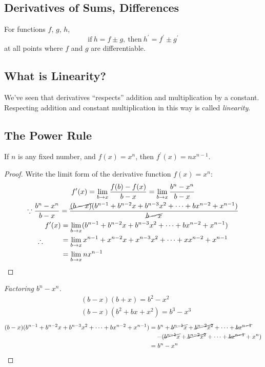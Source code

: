 \subsection{Derivatives of Sums, Differences}
For functions $f$, $g$, $h$,
\[\text{if}\ h=f\pm g,\ \text{then}\ h^\prime=f^\prime\pm g^\prime\]
at all points where $f$ and $g$ are differentiable.

\subsection{What is Linearity?}
We've seen that derivatives ``respects'' addition and multiplication by a constant. Respecting addition and constant multiplication in this way is called \textit{linearity}.

\subsection{The Power Rule}
If $n$ is any fixed number, and $f(x)=x^n$, then $f^\prime(x)=nx^{n-1}$.

\begin{proof}
  Write the limit form of the derivative function $f(x)=x^n$:
  \begin{gather*}
    f^\prime(x)=\lim_{b\to x}\frac{f(b)-f(x)}{b-x}=\lim_{b\to x}\frac{b^n-x^n}{b-x}\\
    \because\frac{b^n-x^n}{b-x}=\frac{\cancel{(b-x)}(b^{n-1}+b^{n-2}x+b^{n-3}x^2+\cdots+bx^{n-2}+x^{n-1})}{\cancel{b-x}}\\
    \therefore\begin{align*}
      f^\prime(x) & =\lim_{b\to x}(b^{n-1}+b^{n-2}x+b^{n-3}x^2+\cdots+bx^{n-2}+x^{n-1})\\
      & =\lim_{b\to x}x^{n-1}+x^{n-2}x+x^{n-3}x^2+\cdots+xx^{n-2}+x^{n-1}\\
      & =\lim_{b\to x}nx^{n-1}
    \end{align*}
  \end{gather*}
\end{proof}
\begin{proof}[Factoring $b^n-x^n$]
  \begin{align*}
    & (b-x)(b+x)=b^2-x^2\\
    & (b-x)(b^2+bx+x^2)=b^3-x^3
  \end{align*}
  \begin{align*}
    (b-x)(b^{n-1}+b^{n-2}x+b^{n-3}x^2+\cdots+bx^{n-2}+x^{n-1}) & =b^n+\cancel{b^{n-1}x}+\cancel{b^{n-2}x^2}+\cdots+\cancel{bx^{n-1}}\\
    & \mathbin{\phantom{=}}-(\cancel{b^{n-1}x}+\cancel{b^{n-2}x^2}+\cdots+\cancel{bx^{n-1}}+x^n)\\
    & =b^n-x^n
  \end{align*}
\end{proof}


